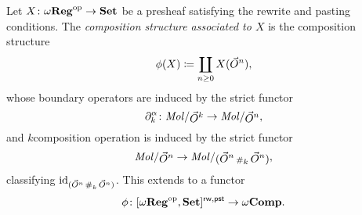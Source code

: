 \begin{dfn}
    Let \( X \colon \omega\mathbf{Reg}^\mathrm{op} \to \mathbf{Set} \) be a presheaf satisfying the rewrite and pasting conditions.
    The \emph{composition structure associated to \( X \)} is the composition structure 
    \begin{equation*}
        \phi(X) \coloneqq \coprod_{n \geq 0} X(\vec{O}^{n}),
    \end{equation*}
    whose boundary operators are induced by the strict functor
    \begin{equation*}
        \bd{k}{\a} \colon \molecin{\dglobe{k}} \to \molecin{\dglobe{n}}, 
    \end{equation*}
    and \( k \)\nbd composition operation is induced by the strict functor
    \begin{equation*}
        \molecin{\dglobe{n}} \to \molecin{(\dglobe{n} \cp{k} \dglobe{n})},
    \end{equation*}
    classifying \( \mathrm{id}_{(\vec{O}^{n} \,{\scriptstyle\#}_{k}\, \vec{O}^{n})} \).
    This extends to a functor 
    \begin{equation*}
        \phi \colon [\omega\mathbf{Reg}^\mathrm{op}, \mathbf{Set}]^{\mathsf{rw, pst}} \to \omega\mathbf{Comp}.
    \end{equation*}
\end{dfn}

